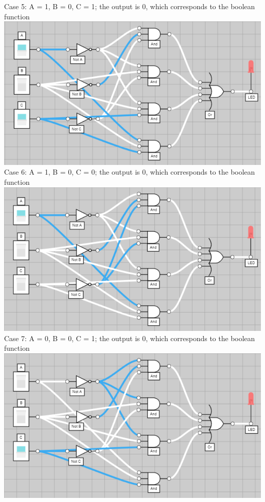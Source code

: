 \documentclass[11pt]{article}
\begin{document}
\begin{enumerate}
        Case 5: A = 1, B = 0, C = 1; the output is 0, which corresponds to the boolean function\\   
        \includegraphics[scale=0.395]{1_0_1}\\[0.25in]
        Case 6: A = 1, B = 0, C = 0; the output is 0, which corresponds to the boolean function\\
        \includegraphics[scale=0.395]{1_0_0}\\[0.25in]
        Case 7: A = 0, B = 0, C = 1; the output is 0, which corresponds to the boolean function\\
        \includegraphics[scale=0.395]{0_0_1}\\[0.25in]

\end{enumerate}
\end{document}
